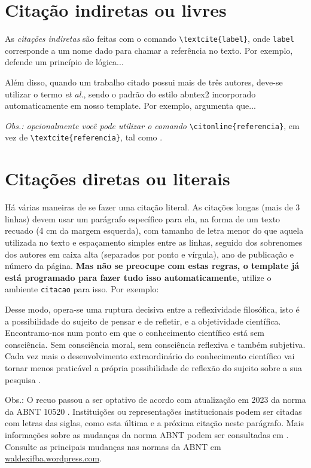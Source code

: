 \section{Citação indiretas ou livres}\label{ciação direta}
As \textit{citações indiretas} são feitas com o comando \verb|\textcite{label}|, onde \verb|label| corresponde a um nome dado para chamar a referência no texto. Por exemplo, \textcite{maturana:2003} defende um princípio de lógica...

Além disso, quando um trabalho citado possui mais de três autores, deve-se utilizar o termo \textit{et al.}, sendo o padrão do estilo {\ttfamily abntex2} incorporado automaticamente em nosso template. Por exemplo, \textcite{teste:2014} argumenta que...

\textit{Obs.: opcionalmente você pode utilizar o comando }\verb|\citonline{referencia}|, em vez de \verb|\textcite{referencia}|, tal como .


\section{Citações diretas ou literais}\label{citacoesdiretas}
Há várias maneiras de se fazer uma citação literal. As citações longas (mais de 3 linhas) devem usar um parágrafo específico para ela, na forma de um texto recuado (4 cm da margem esquerda), com tamanho de letra menor do que aquela utilizada no texto e espaçamento simples entre as linhas, seguido dos sobrenomes dos autores em caixa alta (separados por ponto e vírgula), ano de publicação e número da página. \textbf{Mas não se preocupe com estas regras, o template já está programado para fazer tudo isso automaticamente}, utilize o ambiente \texttt{citacao} para isso. Por exemplo:
\begin{citacao}
Desse modo, opera-se uma ruptura decisiva entre a reflexividade filosófica, isto 	é a possibilidade do sujeito de pensar e de refletir, e a objetividade científica.
Encontramo-nos num ponto em que o conhecimento científico está sem consciência.
Sem consciência moral, sem consciência reflexiva e também subjetiva.
Cada vez mais o desenvolvimento extraordinário do conhecimento científico vai tornar menos praticável a própria possibilidade de reflexão do sujeito sobre a sua pesquisa \cite[p.~28]{morinmoigne:2000}.
\end{citacao}

Obs.: O recuo passou a ser optativo de acordo com atualização em 2023 da norma da ABNT 10520 \cite{NBR10520:2023}. Instituições ou representações institucionais podem ser citadas com letras das siglas, como esta última e a próxima citação neste parágrafo. Mais informações sobre as mudanças da norma ABNT podem ser consultadas em \textcite{abnt2023}. Consulte as principais mudanças nas normas da ABNT em \href{https://waldexifba.wordpress.com/2024/07/26/norma-abnt-principais-mudancas-e-atualizacoes-em-citacoes/}{waldexifba.wordpress.com}.

